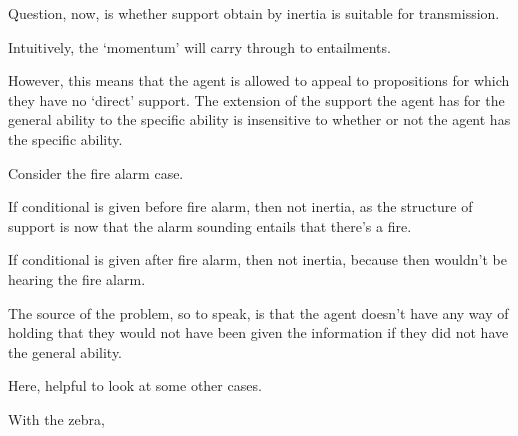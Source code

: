 \documentclass[10pt]{article}
\begin{document}
\begin{note}
  Question, now, is whether support obtain by inertia is suitable for transmission.

  Intuitively, the `momentum' will carry through to entailments.

  However, this means that the agent is allowed to appeal to propositions for which they have no `direct' support.
  The extension of the support the agent has for the general ability to the specific ability is insensitive to whether or not the agent has the specific ability.
  
\end{note}

\begin{note}
  Consider the fire alarm case.

  If conditional is given before fire alarm, then not inertia, as the structure of support is now that the alarm sounding entails that there's a fire.

  If conditional is given after fire alarm, then not inertia, because then wouldn't be hearing the fire alarm.

  The source of the problem, so to speak, is that the agent doesn't have any way of holding that they would not have been given the information if they did not have the general ability.
\end{note}

\begin{note}
  Here, helpful to look at some other cases.

  With the zebra, 
\end{note}
\end{document}
